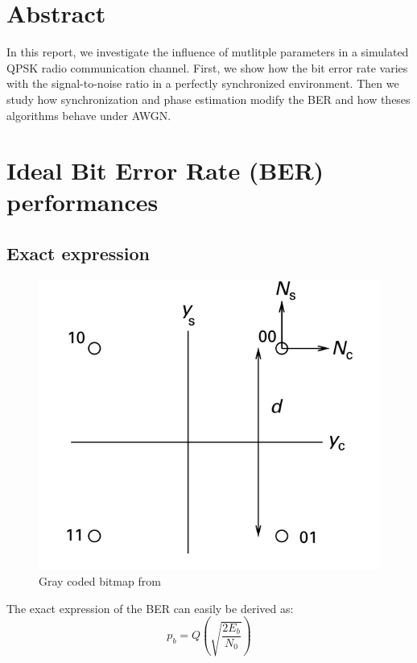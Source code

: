 \documentclass[a4paper,12pt]{article}
\begin{document}

\newpage

\section*{\centering Abstract}
\vspace{1cm}
In this report, we investigate the influence of mutlitple parameters in a simulated QPSK radio communication channel.
First, we show how the bit error rate varies with the signal-to-noise ratio in a perfectly synchronized environment. Then we study how synchronization and phase estimation modify the BER and how theses algorithms behave under AWGN.
\newpage
\section{Ideal Bit Error Rate (BER) performances}

\subsection{Exact expression}
\begin{figure}[ht]
\centering
\begin{center}
\includegraphics[scale=0.20]{Gray_coded_QPSK.png}
\caption{Gray coded bitmap from \cite{Madhow}}
\end{center}
\end{figure}
The exact expression of the BER can easily be derived as:
\begin{equation}
p_{b}=Q(\sqrt{\frac{2E_{b}}{N_{0}}})
\end{equation}
\end{document}
